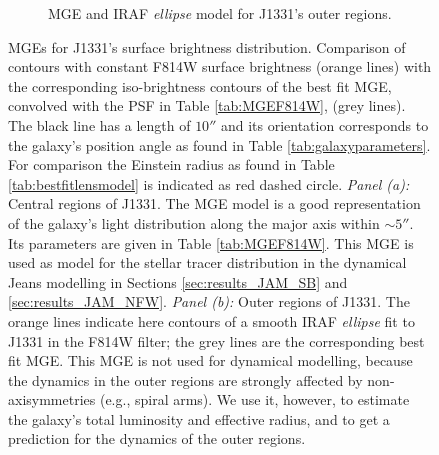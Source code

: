 \documentclass[useAMS,usenatbib]{mnras}
\begin{document}
\begin{figure}
\begin{subfigure}{.5\textwidth}
  \caption{MGE and IRAF \emph{ellipse} model for J1331's outer regions.}
 \label{fig:MGEouterRegions}
\end{subfigure}%
\caption{MGEs for J1331's surface brightness distribution. Comparison of contours with constant F814W surface brightness (orange lines) with the corresponding iso-brightness contours of the best fit MGE, convolved with the PSF in Table \ref{tab:MGEF814W}, (grey lines). The black line has a length of $10''$ and its orientation corresponds to the galaxy's position angle as found in Table \ref{tab:galaxyparameters}. For comparison the Einstein radius as found in Table \ref{tab:bestfitlensmodel}  is indicated as red dashed circle. \emph{Panel (a):} Central regions of J1331. The MGE model is a good representation of the galaxy's light distribution along the major axis within $\sim 5''$. Its parameters are given in Table \ref{tab:MGEF814W}. This MGE is used as model for the stellar tracer distribution in the dynamical Jeans modelling in Sections \ref{sec:results_JAM_SB} and \ref{sec:results_JAM_NFW}. \emph{Panel (b):} Outer regions of J1331. The orange lines indicate here contours of a smooth IRAF \emph{ellipse} fit to J1331 in the F814W filter; the grey lines are the corresponding best fit MGE. This MGE is not used for dynamical modelling, because the dynamics in the outer regions are strongly affected by non-axisymmetries (e.g., spiral arms). We use it, however, to estimate the galaxy's total luminosity and effective radius, and to get a prediction for the dynamics of the outer regions.}
\end{figure}
\end{document}
